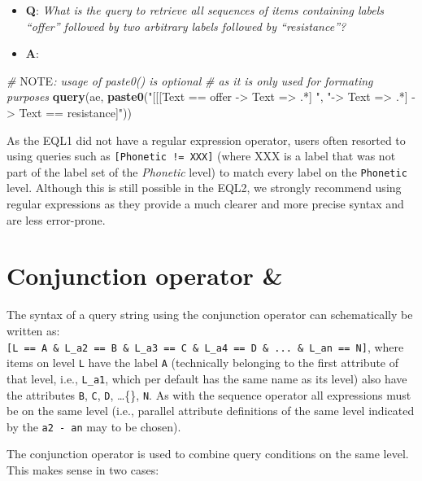 \documentclass[]{book}
\newenvironment{Shaded}{\begin{snugshade}}{\end{snugshade}}
\newcommand{\AlertTok}[1]{\textcolor[rgb]{0.94,0.16,0.16}{#1}}
\newcommand{\CommentTok}[1]{\textcolor[rgb]{0.56,0.35,0.01}{\textit{#1}}}
\newcommand{\KeywordTok}[1]{\textcolor[rgb]{0.13,0.29,0.53}{\textbf{#1}}}
\newcommand{\NormalTok}[1]{#1}
\newcommand{\StringTok}[1]{\textcolor[rgb]{0.31,0.60,0.02}{#1}}
\providecommand{\tightlist}{%
  \setlength{\itemsep}{0pt}\setlength{\parskip}{0pt}}
\theoremstyle{definition}
\theoremstyle{definition}
\theoremstyle{definition}
\theoremstyle{remark}
\begin{document}
\begin{itemize}
\tightlist
\item
  \textbf{Q}: \emph{What is the query to retrieve all sequences of items
  containing labels ``offer'' followed by two arbitrary labels followed
  by ``resistance''?}
\item
  \textbf{A}:
\end{itemize}

\begin{Shaded}
\begin{Highlighting}[]
\CommentTok{# }\AlertTok{NOTE}\CommentTok{: usage of paste0() is optional}
\CommentTok{# as it is only used for formating purposes}
\KeywordTok{query}\NormalTok{(ae, }\KeywordTok{paste0}\NormalTok{(}\StringTok{"[[[Text == offer -> Text => .*] "}\NormalTok{,}
                 \StringTok{"-> Text => .*] -> Text == resistance]"}\NormalTok{))}
\end{Highlighting}
\end{Shaded}

As the EQL1 did not have a regular expression operator, users often
resorted to using queries such as \texttt{{[}Phonetic\ !=\ XXX{]}}
(where XXX is a label that was not part of the label set of the
\emph{Phonetic} level) to match every label on the \texttt{Phonetic}
level. Although this is still possible in the EQL2, we strongly
recommend using regular expressions as they provide a much clearer and
more precise syntax and are less error-prone.

\hypertarget{conjunction-operator}{%
\section{Conjunction operator \&}\label{conjunction-operator}}

The syntax of a query string using the conjunction operator can
schematically be written as:
\texttt{{[}L\ ==\ A\ \&\ L\_a2\ ==\ B\ \&\ L\_a3\ ==\ C\ \&\ L\_a4\ ==\ D\ \&\ ...\ \&\ L\_an\ ==\ N{]}},
where items on level \texttt{L} have the label \texttt{A} (technically
belonging to the first attribute of that level, i.e., \texttt{L\_a1},
which per default has the same name as its level) also have the
attributes \texttt{B}, \texttt{C}, \texttt{D}, \ldots\{\}, \texttt{N}.
As with the sequence operator all expressions must be on the same level
(i.e., parallel attribute definitions of the same level indicated by the
\texttt{a2\ -\ an} may to be chosen).

The conjunction operator is used to combine query conditions on the same
level. This makes sense in two cases:
\end{document}
